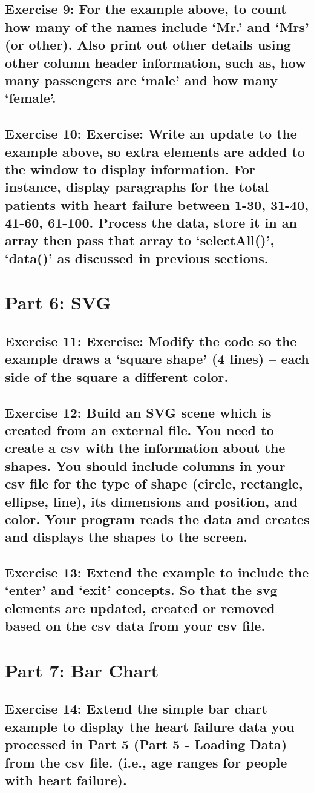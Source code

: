 \documentclass[11pt]{article}   	%
\begin{document}
\subsection{Exercise 9: For the example above, to count how many of the names include ‘Mr.’ and ‘Mrs’ (or other). Also print out other details using other column header information, such as, how many passengers are ‘male’ and how many ‘female’.}
\subsection{Exercise 10: Exercise: Write an update to the example above, so extra elements are added to the window to display information. For instance, display paragraphs for the total patients with heart failure between 1-30, 31-40, 41-60, 61-100. Process the data, store it in an array then pass that array to ‘selectAll()’, ‘data()’ as discussed in previous sections.}


\section{Part 6: SVG}
\subsection{Exercise 11: Exercise: Modify the code so the example draws a ‘square shape’ (4 lines) – each side of the square a different color.}
\subsection{Exercise 12: Build an SVG scene which is created from an external file. You need to create a csv with the information about the shapes. You should include columns in your csv file for the type of shape (circle, rectangle, ellipse, line), its dimensions and position, and color. Your program reads the data and creates and displays the shapes to the screen.}
\subsection{ Exercise 13: Extend the example to include the ‘enter’ and ‘exit’ concepts. So that the svg elements are updated, created or removed based on the csv data from your csv file.}

\section{Part 7: Bar Chart}
\subsection{Exercise 14: Extend the simple bar chart example to display the heart failure data you processed in Part 5 (Part 5 -
Loading Data) from the csv file. (i.e., age ranges for people with heart failure).}
\end{document}
